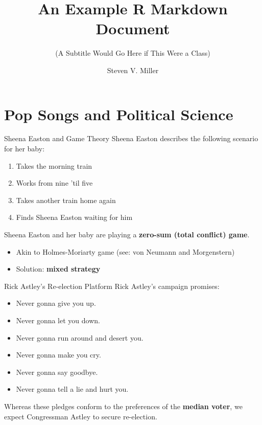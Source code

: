 \documentclass[
  10pt,
  ignorenonframetext,
]{beamer}
\title{An Example R Markdown Document}
\subtitle{(A Subtitle Would Go Here if This Were a Class)}
\author{Steven V. Miller}
\date{}
\institute{Department of Political Science}
\providecommand{\tightlist}{%
  \setlength{\itemsep}{0pt}\setlength{\parskip}{0pt}}
\begin{document}
\frame{\titlepage}

\hypertarget{pop-songs-and-political-science}{%
\section{Pop Songs and Political
Science}\label{pop-songs-and-political-science}}

\begin{frame}{Sheena Easton and Game Theory}
\protect\hypertarget{sheena-easton-and-game-theory}{}
Sheena Easton describes the following scenario for her baby:

\begin{enumerate}
\tightlist
\item
  Takes the morning train
\item
  Works from nine 'til five
\item
  Takes another train home again
\item
  Finds Sheena Easton waiting for him
\end{enumerate}

Sheena Easton and her baby are playing a \textbf{zero-sum (total
conflict) game}.

\begin{itemize}
\tightlist
\item
  Akin to Holmes-Moriarty game (see: von Neumann and Morgenstern)
\item
  Solution: \textbf{mixed strategy}
\end{itemize}
\end{frame}

\begin{frame}{Rick Astley's Re-election Platform}
\protect\hypertarget{rick-astleys-re-election-platform}{}
Rick Astley's campaign promises:

\begin{itemize}
\tightlist
\item
  Never gonna give you up.
\item
  Never gonna let you down.
\item
  Never gonna run around and desert you.
\item
  Never gonna make you cry.
\item
  Never gonna say goodbye.
\item
  Never gonna tell a lie and hurt you.
\end{itemize}

Whereas these pledges conform to the preferences of the \textbf{median
voter}, we expect Congressman Astley to secure re-election.
\end{frame}
\end{document}
